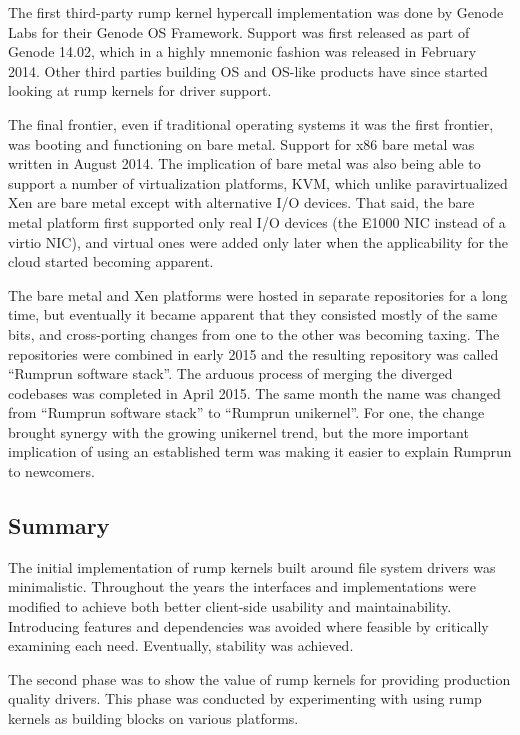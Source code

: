 The first third-party rump kernel hypercall implementation was done by
Genode Labs for their Genode OS Framework.  Support was first released
as part of Genode 14.02, which in a highly mnemonic fashion was released
in February 2014.  Other third parties building OS and OS-like products
have since started looking at rump kernels for driver support.

The final frontier, even if traditional operating systems it was the
first frontier, was booting and functioning on bare metal.  Support for
x86 bare metal was written in August 2014.  The implication of bare metal
was also being able to support a number of virtualization platforms, \eg
KVM, which unlike paravirtualized Xen are bare metal except with alternative
I/O devices.  That said, the bare metal platform first supported only
real I/O devices (\eg the E1000 NIC instead of a virtio NIC), and virtual
ones were added only later when the applicability for the cloud started
becoming apparent.

The bare metal and Xen platforms were hosted in separate repositories
for a long time, but eventually it became apparent that they consisted
mostly of the same bits, and cross-porting changes from one to the other
was becoming taxing.  The repositories were combined in early 2015 and
the resulting repository was called ``Rumprun software stack''.  The arduous
process of merging the diverged codebases was completed in April 2015.
The same month the name was changed from ``Rumprun software stack''
to ``Rumprun unikernel''.  For one, the change brought synergy with the
growing unikernel trend, but the more important implication of using an
established term was making it easier to explain Rumprun to newcomers.


\subsection{Summary}

The initial implementation of rump kernels built around file system
drivers was minimalistic.  Throughout the years the interfaces and
implementations were modified to achieve both better client-side usability
and maintainability.  Introducing features and dependencies was avoided
where feasible by critically examining each need.  Eventually, stability
was achieved.

The second phase was to show the value of rump kernels for providing
production quality drivers.  This phase was conducted by experimenting
with using rump kernels as building blocks on various platforms.
